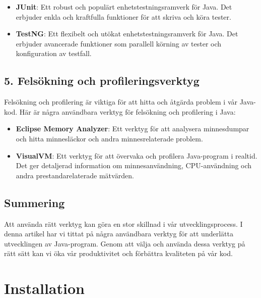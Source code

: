 \begin{itemize}
\tightlist
\item
  \textbf{JUnit}: Ett robust och populärt enhetstestningsramverk för
  Java. Det erbjuder enkla och kraftfulla funktioner för att skriva och
  köra tester.
\item
  \textbf{TestNG}: Ett flexibelt och utökat enhetstestningsramverk för
  Java. Det erbjuder avancerade funktioner som parallell körning av
  tester och konfiguration av testfall.
\end{itemize}

\hypertarget{felsuxf6kning-och-profileringsverktyg}{%
\subsection{5. Felsökning och
profileringsverktyg}\label{felsuxf6kning-och-profileringsverktyg}}

Felsökning och profilering är viktiga för att hitta och åtgärda problem
i vår Java-kod. Här är några användbara verktyg för felsökning och
profilering i Java:

\begin{itemize}
\tightlist
\item
  \textbf{Eclipse Memory Analyzer}: Ett verktyg för att analysera
  minnesdumpar och hitta minnesläckor och andra minnesrelaterade
  problem.
\item
  \textbf{VisualVM}: Ett verktyg för att övervaka och profilera
  Java-program i realtid. Det ger detaljerad information om
  minnesanvändning, CPU-användning och andra prestandarelaterade
  mätvärden.
\end{itemize}

\hypertarget{summering}{%
\subsection{Summering}\label{summering}}

Att använda rätt verktyg kan göra en stor skillnad i vår
utvecklingsprocess. I denna artikel har vi tittat på några användbara
verktyg för att underlätta utvecklingen av Java-program. Genom att välja
och använda dessa verktyg på rätt sätt kan vi öka vår produktivitet och
förbättra kvaliteten på vår kod.

\hypertarget{installation}{%
\section{Installation}\label{installation}}


